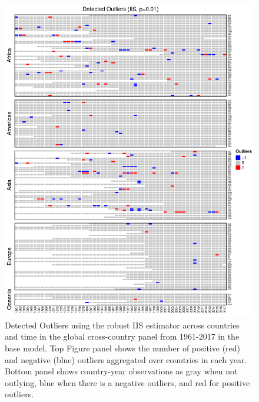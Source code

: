 \documentclass[11pt, letterpaper]{article}
\numberwithin{algorithm}{section}
\numberwithin{assumption}{section}
\numberwithin{lemma}{section}
\numberwithin{theorem}{section}
\numberwithin{corollary}{section}
\numberwithin{remark}{section}
\numberwithin{equation}{section}
\numberwithin{figure}{section}
\numberwithin{table}{section}
\begin{document}
\begin{figure}[!htbp]  \vspace{-.35in}
\centering
\includegraphics[width = \textwidth]{heat1.pdf}
\caption{Detected Outliers using the robust IIS estimator across countries and time in the global cross-country panel from 1961-2017 in the base model. Top Figure panel shows the number of positive (red) and negative (blue) outliers aggregated over countries in each year. Bottom panel shows country-year observations as gray when not outlying, blue when there is a negative outliers, and red for positive outliers.}
\label{fig_out_app1_appendix}
\end{figure}
\end{document}
